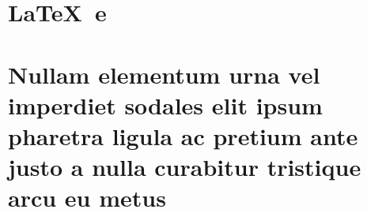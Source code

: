 \documentclass[
		12pt,				%
		openright,			%
		oneside,			%
		a4paper,			%
		chapter=TITLE,		%
		english,			%
		brazil				%
	]{abntex2}
\begin{document}
\begin{apendicesenv}

\chapter{\LaTeX\ e \abnTeX}\label{ap:latex}

\lipsum[50]

\chapter{Nullam elementum urna vel imperdiet sodales elit ipsum pharetra ligula
ac pretium ante justo a nulla curabitur tristique arcu eu metus}
\lipsum[55-57]

\end{apendicesenv}

\end{document}

